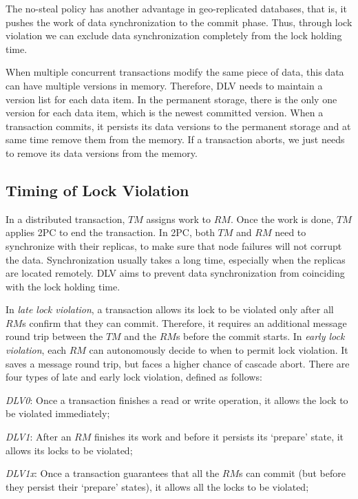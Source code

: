 \documentclass[conference]{IEEEtran}
\begin{document}
The no-steal policy has another advantage in geo-replicated databases, that is, it pushes the work of data synchronization to the commit phase.
Thus, through lock violation we can exclude data synchronization completely from the lock holding time. %

When multiple concurrent transactions modify the same piece of data, this data can have multiple versions in memory.
Therefore, DLV needs to maintain a version list for each data item.
In the permanent storage, there is the only one version for each data item, which is the newest committed version.
When a transaction commits, it persists its data versions to the permanent storage and at same time remove them from the memory. 
If a transaction aborts, we just needs to remove its data versions from the memory.



\subsection {Timing of Lock Violation}


In a distributed transaction, $TM$ assigns work to $RM$. Once the work is done, $TM$ applies 2PC to end the transaction.
In 2PC, both $TM$ and $RM$ need to synchronize with their replicas, to make sure that node failures will not corrupt the data.
Synchronization usually takes a long time, especially when the replicas are located remotely.
DLV aims to prevent data synchronization from coinciding with the lock holding time.


In \emph{late lock violation}, a transaction allows its lock to be violated only after all $RM$s confirm that they can commit.
Therefore, it requires an additional message round trip between the $TM$ and the $RM$s before the commit starts.
In \emph{early lock violation}, each $RM$ can autonomously decide to when to permit lock violation.
It saves a message round trip, but faces a higher chance of cascade abort.
There are four types of late and early lock violation, defined as follows:

\emph{DLV0}: Once a transaction finishes a read or write operation, it allows the lock to be violated immediately;

\emph{DLV1}: After an ${RM}$ finishes its work and before it persists its `prepare' state, it allows its locks to be violated;

\emph{DLV1x}: Once a transaction guarantees that all the ${RM}$s can commit (but before they persist their `prepare' states), it allows all the locks to be violated;
\end{document}

